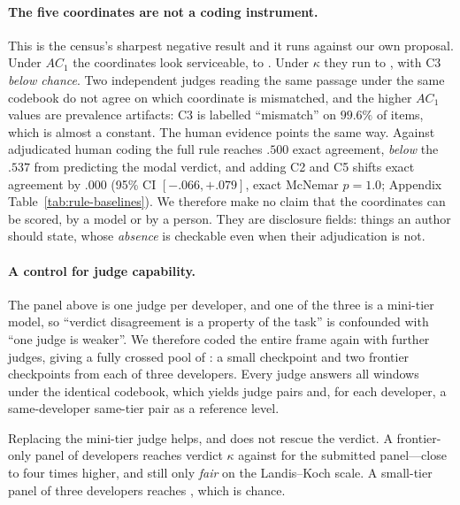 \documentclass[11pt]{article}
\begin{document}
\paragraph{The five coordinates are not a coding instrument.}
This is the census's sharpest negative result and it runs against our own
proposal. Under $AC_1$ the coordinates look serviceable, \DecCoordMin{} to
\DecCoordMax{}. Under $\kappa$ they run \DecCoordKMin{} to \DecCoordKMax{}, with
C3 \emph{below chance}. Two independent judges reading the same passage under
the same codebook do not agree on which coordinate is mismatched, and the higher
$AC_1$ values are prevalence artifacts: C3 is labelled ``mismatch'' on
$99.6\%$ of items, which is almost a constant. The human evidence points the
same way. Against adjudicated human coding the full rule reaches $.500$ exact
agreement, \emph{below} the $.537$ from predicting the modal verdict, and adding
C2 and C5 shifts exact agreement by $.000$ (95\% CI $[-.066,+.079]$, exact
McNemar $p=1.0$; Appendix Table~\ref{tab:rule-baselines}). We therefore make no
claim that the coordinates can be scored, by a model or by a person. They are
disclosure fields: things an author should state, whose \emph{absence} is
checkable even when their adjudication is not.

\paragraph{A control for judge capability.}
The panel above is one judge per developer, and one of the three is a
mini-tier model, so ``verdict disagreement is a property of the task'' is
confounded with ``one judge is weaker''. We therefore coded the entire frame
again with \TierNew{} further judges, giving a fully crossed pool of
\TierPanelN{}: a small checkpoint and two frontier checkpoints from each of
three developers. Every judge answers all \FrameCandidates{} windows under the
identical codebook, which yields \TierNPairs{} judge pairs and, for each
developer, a same-developer same-tier pair as a reference level.



\noindent Replacing the mini-tier judge helps, and does not rescue the verdict.
A frontier-only panel of \TierFrontierDevs{} developers reaches verdict
$\kappa$ \TierFrontierVerdictK{} against \TierSubmittedVerdictK{} for the
submitted panel---close to four times higher, and still only \emph{fair} on the
Landis--Koch scale. A small-tier panel of three developers reaches
\TierSmallVerdictK{}, which is chance.
\end{document}
